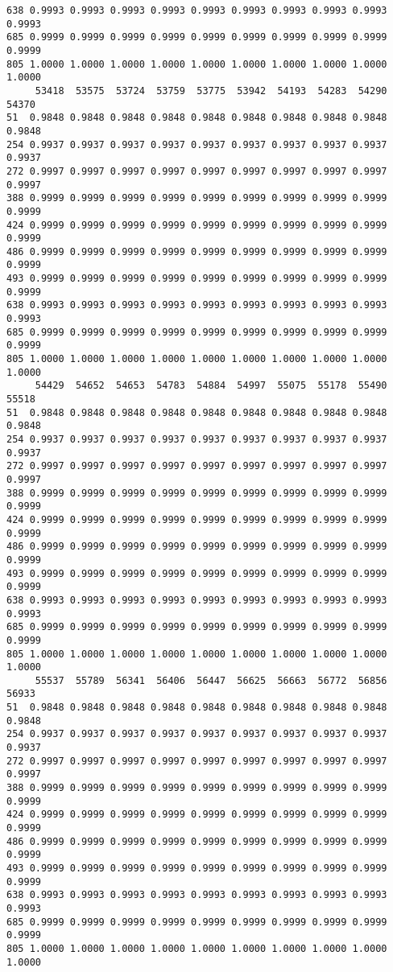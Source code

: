 \documentclass[
]{report}
\begin{document}
\begin{verbatim}
638 0.9993 0.9993 0.9993 0.9993 0.9993 0.9993 0.9993 0.9993 0.9993 0.9993
685 0.9999 0.9999 0.9999 0.9999 0.9999 0.9999 0.9999 0.9999 0.9999 0.9999
805 1.0000 1.0000 1.0000 1.0000 1.0000 1.0000 1.0000 1.0000 1.0000 1.0000
     53418  53575  53724  53759  53775  53942  54193  54283  54290  54370
51  0.9848 0.9848 0.9848 0.9848 0.9848 0.9848 0.9848 0.9848 0.9848 0.9848
254 0.9937 0.9937 0.9937 0.9937 0.9937 0.9937 0.9937 0.9937 0.9937 0.9937
272 0.9997 0.9997 0.9997 0.9997 0.9997 0.9997 0.9997 0.9997 0.9997 0.9997
388 0.9999 0.9999 0.9999 0.9999 0.9999 0.9999 0.9999 0.9999 0.9999 0.9999
424 0.9999 0.9999 0.9999 0.9999 0.9999 0.9999 0.9999 0.9999 0.9999 0.9999
486 0.9999 0.9999 0.9999 0.9999 0.9999 0.9999 0.9999 0.9999 0.9999 0.9999
493 0.9999 0.9999 0.9999 0.9999 0.9999 0.9999 0.9999 0.9999 0.9999 0.9999
638 0.9993 0.9993 0.9993 0.9993 0.9993 0.9993 0.9993 0.9993 0.9993 0.9993
685 0.9999 0.9999 0.9999 0.9999 0.9999 0.9999 0.9999 0.9999 0.9999 0.9999
805 1.0000 1.0000 1.0000 1.0000 1.0000 1.0000 1.0000 1.0000 1.0000 1.0000
     54429  54652  54653  54783  54884  54997  55075  55178  55490  55518
51  0.9848 0.9848 0.9848 0.9848 0.9848 0.9848 0.9848 0.9848 0.9848 0.9848
254 0.9937 0.9937 0.9937 0.9937 0.9937 0.9937 0.9937 0.9937 0.9937 0.9937
272 0.9997 0.9997 0.9997 0.9997 0.9997 0.9997 0.9997 0.9997 0.9997 0.9997
388 0.9999 0.9999 0.9999 0.9999 0.9999 0.9999 0.9999 0.9999 0.9999 0.9999
424 0.9999 0.9999 0.9999 0.9999 0.9999 0.9999 0.9999 0.9999 0.9999 0.9999
486 0.9999 0.9999 0.9999 0.9999 0.9999 0.9999 0.9999 0.9999 0.9999 0.9999
493 0.9999 0.9999 0.9999 0.9999 0.9999 0.9999 0.9999 0.9999 0.9999 0.9999
638 0.9993 0.9993 0.9993 0.9993 0.9993 0.9993 0.9993 0.9993 0.9993 0.9993
685 0.9999 0.9999 0.9999 0.9999 0.9999 0.9999 0.9999 0.9999 0.9999 0.9999
805 1.0000 1.0000 1.0000 1.0000 1.0000 1.0000 1.0000 1.0000 1.0000 1.0000
     55537  55789  56341  56406  56447  56625  56663  56772  56856  56933
51  0.9848 0.9848 0.9848 0.9848 0.9848 0.9848 0.9848 0.9848 0.9848 0.9848
254 0.9937 0.9937 0.9937 0.9937 0.9937 0.9937 0.9937 0.9937 0.9937 0.9937
272 0.9997 0.9997 0.9997 0.9997 0.9997 0.9997 0.9997 0.9997 0.9997 0.9997
388 0.9999 0.9999 0.9999 0.9999 0.9999 0.9999 0.9999 0.9999 0.9999 0.9999
424 0.9999 0.9999 0.9999 0.9999 0.9999 0.9999 0.9999 0.9999 0.9999 0.9999
486 0.9999 0.9999 0.9999 0.9999 0.9999 0.9999 0.9999 0.9999 0.9999 0.9999
493 0.9999 0.9999 0.9999 0.9999 0.9999 0.9999 0.9999 0.9999 0.9999 0.9999
638 0.9993 0.9993 0.9993 0.9993 0.9993 0.9993 0.9993 0.9993 0.9993 0.9993
685 0.9999 0.9999 0.9999 0.9999 0.9999 0.9999 0.9999 0.9999 0.9999 0.9999
805 1.0000 1.0000 1.0000 1.0000 1.0000 1.0000 1.0000 1.0000 1.0000 1.0000

\end{verbatim}
\end{document}
